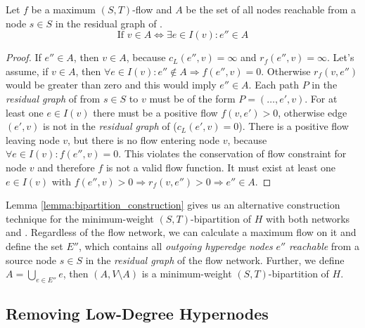 \begin{lemma}
\label{lemma:bipartition_construction}
Let $f$ be a maximum $(S,T)$-flow and $A$ be the set of all nodes reachable
from a node $s \in S$ in the residual graph of .
\[ \text{If } v \in A \Leftrightarrow \exists e \in I(v): e'' \in A \]
\end{lemma}

\begin{proof}
If $e'' \in A$, then $v \in A$, because $c_L(e'',v) = \infty$ and $r_f(e'',v) = \infty$.
Let's assume, if $v \in A$, then $\forall e \in I(v): e'' \notin A \Rightarrow f(e'',v) = 0$. 
Otherwise $r_f(v, e'')$ would be greater than zero and this would imply $e'' \in A$. Each path 
$P$ in the \emph{residual graph} of  from $s \in S$ to $v$ must be of the 
form $P = (\ldots,e',v)$. For at least one $e \in I(v)$ there must be a positive flow $f(v,e') > 0$,
otherwise edge $(e',v)$ is not in the \emph{residual graph} of  ($c_L(e',v) = 0$).
There is a positive flow leaving node $v$, but there is no flow entering node $v$, because
$\forall e \in I(v): f(e'',v) = 0$. This violates the conservation of flow
constraint for node $v$ and therefore $f$ is not a valid flow function. It must exist at least one $e \in I(v)$
with $f(e'',v) > 0 \Rightarrow r_f(v,e'') > 0 \Rightarrow e'' \in A$.
\end{proof}

Lemma \ref{lemma:bipartition_construction} gives us an alternative construction technique for the minimum-weight $(S,T)$-bipartition
of $H$ with both networks  and . Regardless of the flow network, we can 
calculate a maximum flow on it and define the set $E''$, which contains all \emph{outgoing hyperedge
nodes} $e''$ \emph{reachable} from a source node $s \in S$ in the \emph{residual graph} of the flow network. 
Further, we define $A = \bigcup_{e \in E''} e$, then $(A,V\setminus A)$ is a 
minimum-weight $(S,T)$-bipartition of $H$.


\subsection{Removing Low-Degree Hypernodes}
\label{sec:degree_network}

